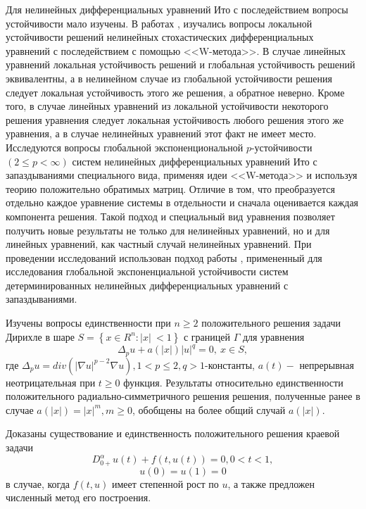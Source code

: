 Для нелинейных дифференциальных уравнений Ито с последействием
вопросы устойчивости мало изучены. В работах \cite{kad5}, \cite{kad6} изучались
вопросы локальной устойчивости решений нелинейных стохастических
дифференциальных уравнений с последействием с помощью <<W-метода>>. В
случае линейных уравнений локальная устойчивость решений и
глобальная устойчивость решений эквивалентны, а в нелинейном случае
из глобальной устойчивости решения следует локальная устойчивость
этого же решения, а обратное неверно. Кроме того, в случае линейных
уравнений из локальной устойчивости некоторого решения уравнения
следует локальная устойчивость любого решения этого же уравнения, а в
случае нелинейных уравнений этот факт не имеет место.
Исследуются вопросы  глобальной
экспоненциональной $p$-устойчи\-вос\-ти $(2 \le p < \infty )$ систем
нелинейных дифференциальных уравнений Ито с запаздываниями
специального вида, применяя идеи <<W-метода>> и  используя теорию
положительно обратимых матриц. Отличие в том, что преобразуется
отдельно каждое уравнение системы в отдельности и сначала
оценивается каждая компонента решения. Такой подход и специальный
вид уравнения позволяет получить новые результаты не только для
нелинейных уравнений, но и для линейных уравнений, как частный
случай нелинейных уравнений. При проведении исследований использован
подход работы \cite{kad7}, примененный для исследования глобальной
экспоненциальной устойчивости систем детерминированных нелинейных
дифференциальных уравнений с запаздываниями.



Изучены вопросы единственности при $ n \geq 2$ положительного решения задачи Дирихле
в шаре
$ S=\left\{x\in R^n:\vert x \vert\ < 1 \right\} $
 с границей $\Gamma $
для уравнения
$$
\Delta_{p} u+a(|x|){\vert u \vert}^q=0,\ x \in S,
$$
 где $ \Delta_{p} u=div(\vert \nabla u\vert^{p-2}\nabla u),
 1<p \le2, q>1 $-константы, $a(t)-$ непрерывная неотрицательная
 при $t\geq 0 $ функция.
Результаты
относительно единственности положительного радиально-симметричного
решения решения, полученные ранее в случае
$a(|x|)=|x|^m, m\geq 0 $, обобщены на более общий случай $ a(|x|).$

Доказаны существование и
единственность положительного решения краевой задачи
$$
D_{0+}^{\alpha} u(t)+f(t,u(t) )=0,0<t<1,
$$
$$
 u(0)=u(1)=0
$$
в случае, когда $f(t,u)$ имеет степенной рост по $u$, а также предложен
численный метод его построения.
















